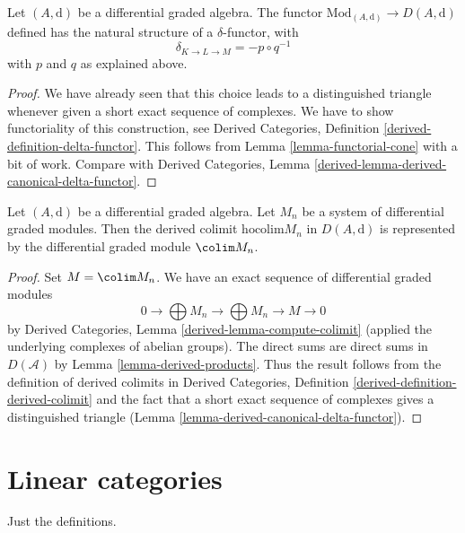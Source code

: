 \begin{lemma}
\label{lemma-derived-canonical-delta-functor}
Let $(A, \text{d})$ be a differential graded algebra. The functor
$\text{Mod}_{(A, \text{d})} \to D(A, \text{d})$
defined has the natural structure of a $\delta$-functor, with
$$
\delta_{K \to L \to M} = - p \circ q^{-1}
$$
with $p$ and $q$ as explained above.
\end{lemma}

\begin{proof}
We have already seen that this choice leads to a distinguished
triangle whenever given a short exact sequence of complexes.
We have to show functoriality of this construction, see
Derived Categories, Definition \ref{derived-definition-delta-functor}.
This follows from Lemma \ref{lemma-functorial-cone} with a bit of
work. Compare with
Derived Categories, Lemma \ref{derived-lemma-derived-canonical-delta-functor}.
\end{proof}

\begin{lemma}
\label{lemma-homotopy-colimit}
Let $(A, \text{d})$ be a differential graded algebra. Let
$M_n$ be a system of differential graded modules. Then the derived
colimit $\text{hocolim} M_n$ in $D(A, \text{d})$ is represented
by the differential graded module $\colim M_n$.
\end{lemma}

\begin{proof}
Set $M = \colim M_n$. We have an exact sequence of differential graded modules
$$
0 \to \bigoplus M_n \to \bigoplus M_n \to M \to 0
$$
by Derived Categories, Lemma \ref{derived-lemma-compute-colimit}
(applied the underlying complexes of abelian groups).
The direct sums are direct sums in $D(\mathcal{A})$ by
Lemma \ref{lemma-derived-products}.
Thus the result follows from the definition
of derived colimits in Derived Categories,
Definition \ref{derived-definition-derived-colimit}
and the fact that a short exact sequence of complexes
gives a distinguished triangle
(Lemma \ref{lemma-derived-canonical-delta-functor}).
\end{proof}








\section{Linear categories}
\label{section-linear}

\noindent
Just the definitions.

